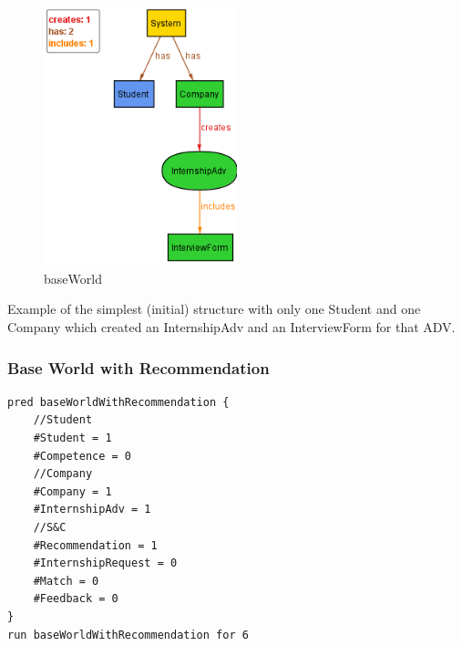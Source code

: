 \begin{figure}[h]
    \centering
    \includegraphics[width=0.5\textwidth]{Images/AlloyModel_images/baseWorld.png}
    \caption{baseWorld}
    \label{fig:figure2}
\end{figure}
Example of the simplest (initial) structure with only one Student and one Company which created an InternshipAdv and an InterviewForm for that ADV.

\clearpage

\subsubsection{Base World with Recommendation}
\begin{lstlisting}
pred baseWorldWithRecommendation {
	//Student
	#Student = 1
	#Competence = 0
	//Company
	#Company = 1
	#InternshipAdv = 1
	//S&C
	#Recommendation = 1
	#InternshipRequest = 0
	#Match = 0
	#Feedback = 0
}
run baseWorldWithRecommendation for 6
\end{lstlisting}

